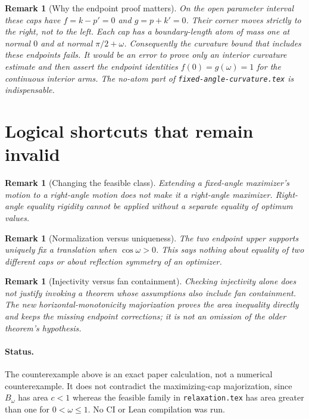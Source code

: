 \documentclass[11pt]{article}
\newtheorem{remark}[theorem]{Remark}
\begin{document}
\begin{remark}[Why the endpoint proof matters]
On the open parameter interval these caps have $f=k-p'=0$ and $g=p+k'=0$. Their corner moves strictly to the right, not to the left. Each cap has a boundary-length atom of mass one at normal $0$ and at normal $\pi/2+\omega$. Consequently the curvature bound that includes these endpoints fails. It would be an error to prove only an interior curvature estimate and then assert the endpoint identities $f(0)=g(\omega)=1$ for the continuous interior arms. The no-atom part of \texttt{fixed-angle-curvature.tex} is indispensable.
\end{remark}

\section{Logical shortcuts that remain invalid}
\begin{remark}[Changing the feasible class]
Extending a fixed-angle maximizer's motion to a right-angle motion does not make it a right-angle maximizer. Right-angle equality rigidity cannot be applied without a separate equality of optimum values.
\end{remark}
\begin{remark}[Normalization versus uniqueness]
The two endpoint upper supports uniquely fix a translation when $\cos\omega>0$. This says nothing about equality of two different caps or about reflection symmetry of an optimizer.
\end{remark}
\begin{remark}[Injectivity versus fan containment]
Checking injectivity alone does not justify invoking a theorem whose assumptions also include fan containment. The new horizontal-monotonicity majorization proves the area inequality directly and keeps the missing endpoint corrections; it is not an omission of the older theorem's hypothesis.
\end{remark}

\paragraph{Status.}
The counterexample above is an exact paper calculation, not a numerical counterexample. It does not contradict the maximizing-cap majorization, since $B_\omega$ has area $c<1$ whereas the feasible family in \texttt{relaxation.tex} has area greater than one for $0<\omega\le1$. No CI or Lean compilation was run.
\end{document}
